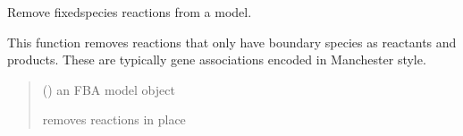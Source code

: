 \documentclass[letterpaper,12pt,english]{sphinxmanual}
\begin{document}
\begin{fulllineitems}
\label{\detokenize{api/core:cbmpy.CBTools.removeFixedSpeciesReactions}}
\pysigstartsignatures
\pysiglinewithargsret
{}
{}
{}
\pysigstopsignatures
\sphinxAtStartPar
Remove fixed\sphinxhyphen{}species reactions from a model.

\sphinxAtStartPar
This function removes reactions that only have boundary species as reactants
and products. These are typically gene associations encoded in Manchester style.
\begin{quote}\begin{description}
\sphinxAtStartPar
{} () \textendash{} an FBA model object

\sphinxAtStartPar
{} \textendash{} removes reactions in place

\end{description}\end{quote}

\end{fulllineitems}

\end{document}
